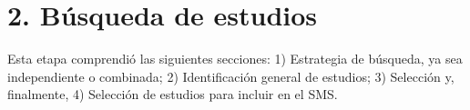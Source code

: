 

\section*{2. Búsqueda de estudios}
\label{cap:busquedaEstudios}
Esta etapa comprendió las siguientes secciones: 
1) Estrategia de búsqueda, ya sea independiente o combinada; 
2) Identificación general de estudios; 
3) Selección y, finalmente, 
4) Selección de estudios para incluir en el SMS.